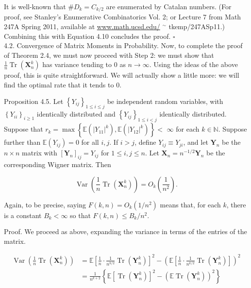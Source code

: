 \documentclass[10pt]{article}
\begin{document}
It is well-known that $\# D_{k}=C_{k / 2}$ are enumerated by Catalan numbers. (For proof, see Stanley's Enumerative Combinatorics Vol. 2; or Lecture 7 from Math 247A Spring 2011, available at \href{http://www.math.ucsd.edu/}{www.math.ucsd.edu/} ${ }^{\sim}$ tkemp/247ASp11.) Combining this with Equation 4.10 concludes the proof. \(\square\)\\
4.2. Convergence of Matrix Moments in Probability. Now, to complete the proof of Theorem 2.4, we must now proceed with Step 2: we must show that $\frac{1}{n} \operatorname{Tr}\left(\mathbf{X}_{n}^{k}\right)$ has variance tending to 0 as $n \rightarrow \infty$. Using the ideas of the above proof, this is quite straightforward. We will actually show a little more: we will find the optimal rate that it tends to 0.

Proposition 4.5. Let $\left\{Y_{i j}\right\}_{1 \leq i \leq j}$ be independent random variables, with $\left\{Y_{i i}\right\}_{i \geq 1}$ identically distributed and $\left\{Y_{i j}\right\}_{1 \leq i<j}$ identically distributed. Suppose that $r_{k}=\max \left\{\mathbb{E}\left(\left|Y_{11}\right|^{k}\right), \mathbb{E}\left(\left|Y_{12}\right|^{k}\right)\right\}<$ $\infty$ for each $k \in \mathbb{N}$. Suppose further than $\mathbb{E}\left(Y_{i j}\right)=0$ for all $i, j$. If $i>j$, define $Y_{i j} \equiv Y_{j i}$, and let $\mathbf{Y}_{n}$ be the $n \times n$ matrix with $\left[\mathbf{Y}_{n}\right]_{i j}=Y_{i j}$ for $1 \leq i, j \leq n$. Let $\mathbf{X}_{n}=n^{-1 / 2} \mathbf{Y}_{n}$ be the corresponding Wigner matrix. Then

$$
\operatorname{Var}\left(\frac{1}{n} \operatorname{Tr}\left(\mathbf{X}_{n}^{k}\right)\right)=O_{k}\left(\frac{1}{n^{2}}\right) .
$$

Again, to be precise, saying $F(k, n)=O_{k}\left(1 / n^{2}\right)$ means that, for each $k$, there is a constant $B_{k}<\infty$ so that $F(k, n) \leq B_{k} / n^{2}$.

Proof. We proceed as above, expanding the variance in terms of the entries of the matrix.

$$
\begin{aligned}
\operatorname{Var}\left(\frac{1}{n} \operatorname{Tr}\left(\mathbf{X}_{n}^{k}\right)\right) & =\mathbb{E}\left[\frac{1}{n} \cdot \frac{1}{n^{k / 2}} \operatorname{Tr}\left(\mathbf{Y}_{n}^{k}\right)\right]^{2}-\left(\mathbb{E}\left[\frac{1}{n} \cdot \frac{1}{n^{k / 2}} \operatorname{Tr}\left(\mathbf{Y}_{n}^{k}\right)\right]\right)^{2} \\
& =\frac{1}{n^{k+2}}\left\{\mathbb{E}\left[\operatorname{Tr}\left(\mathbf{Y}_{n}^{k}\right)\right]^{2}-\left(\mathbb{E} \operatorname{Tr}\left(\mathbf{Y}_{n}^{k}\right)\right)^{2}\right\}
\end{aligned}
$$
\end{document}

